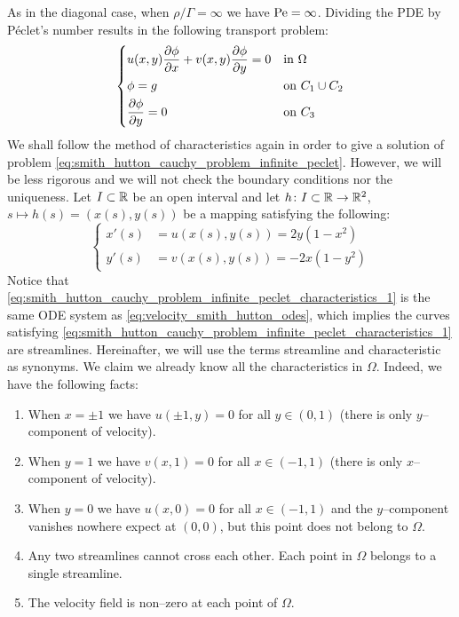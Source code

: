 As in the diagonal case, when $\rho / \Gamma = \infty$ we have $\mathrm{Pe} =
\infty$. Dividing the PDE by Péclet's number results in the following transport
problem:
\begin{equation} \label{eq:smith_hutton_cauchy_problem_infinite_peclet} 
	\left\{
	\begin{aligned}
		&u(x,y) \pdv{\phi}{x} + v(x,y) \pdv{\phi}{y} = 0 &
		&\text{in } \Omega \\
		&\phi = g & 
		&\text{on } C_1 \cup C_2 \\
		&\frac{\partial \phi}{\partial y} = 0 & 
		&\text{on } C_3
	\end{aligned}
	\right.
\end{equation}
We shall follow the method of characteristics again in order to give a solution
of problem \eqref{eq:smith_hutton_cauchy_problem_infinite_peclet}. However, we
will be less rigorous and we will not check the boundary conditions nor the
uniqueness. Let $I \subset \mathbb{R}$ be an open interval and let $h \colon I
\subset \mathbb{R} \to \mathbb{R}^2$, $s \mapsto h(s) = (x(s), y(s))$ be a mapping
satisfying the following:
\begin{equation} \label{eq:smith_hutton_cauchy_problem_infinite_peclet_characteristics_1} 
	\left\{
	\begin{aligned}
		x'(s) &= u(x(s), y(s)) = 2 y (1 - x^2) \\
		y'(s) &= v(x(s), y(s)) = - 2 x (1 - y^2)
	\end{aligned}
	\right.
\end{equation}
Notice that
\eqref{eq:smith_hutton_cauchy_problem_infinite_peclet_characteristics_1} is the
same ODE system as \eqref{eq:velocity_smith_hutton_odes}, which implies the
curves satisfying
\eqref{eq:smith_hutton_cauchy_problem_infinite_peclet_characteristics_1} are
streamlines. Hereinafter, we will use the terms streamline and characteristic as
synonyms. We claim we already know all the characteristics in $\Omega$. Indeed,
we have the following facts:
\begin{enumerate}[label={(\roman*)}, topsep=0pt]
\label{lab:smith_hutton_cauchy_problem_infinite_peclet_i}
	\item When $x = \pm 1$ we have $u(\pm 1, y) = 0$ for all $y \in (0, 1)$
	(there is only $y$--component of velocity).
	\label{lab:smith_hutton_cauchy_problem_infinite_peclet_x}
	\item When $y = 1$ we have $v(x, 1) = 0$ for all $x \in (-1,1)$ (there is
	only $x$--component of velocity).
	\label{lab:smith_hutton_cauchy_problem_infinite_peclet_y}
	\item When $y = 0$ we have $u(x,0) = 0$ for all $x \in (-1,1)$ and the
	$y$--component vanishes nowhere expect at $(0,0)$, but this point does not
	belong to $\Omega$.
	\label{lab:smith_hutton_cauchy_problem_infinite_peclet_iv}
	\item Any two streamlines cannot cross each other. Each point in $\Omega$
	belongs to a single streamline.
	\label{lab:smith_hutton_cauchy_problem_infinite_peclet_v}
	\item The velocity field is non--zero at each point of $\Omega$.
\end{enumerate}
